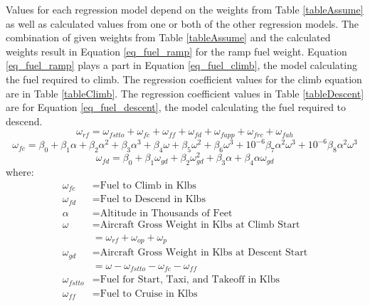 Values for each regression model depend on the weights from Table \ref{tableAssume} as well as calculated values from one or both of the other regression models.  The combination of given weights from Table \ref{tableAssume} and the calculated weights result in Equation \ref{eq_fuel_ramp} for the ramp fuel weight. Equation  \ref{eq_fuel_ramp} plays a part in Equation \ref{eq_fuel_climb}, the model calculating the fuel required to climb.  The regression coefficient values for the climb equation are in Table \ref{tableClimb}. The regression coefficient values in Table \ref{tableDescent} are for Equation \ref{eq_fuel_descent}, the model calculating the fuel required to descend.  \newline
\begin{equation}
\label{eq_fuel_ramp}
\omega_{rf}=\omega_{fstto}+\omega_{fc}+\omega_{ff}+\omega_{fd}+ \omega_{fapp}+\omega_{frc}+\omega_{fah}
\end{equation}
\begin{equation}
\label{eq_fuel_climb}
\omega_{fc}=\beta_0+\beta_1\alpha+\beta_2\alpha^2+\beta_3\alpha^3+\beta_4\omega+\beta_5\omega^2+\beta_6\omega^3+10^{-6}\beta_7\alpha^2\omega^3+10^{-6}\beta_8\alpha^2\omega^3
\end{equation}
\begin{equation}
\label{eq_fuel_descent}
\omega_{fd}=\beta_0+\beta_1\omega_{gd}+\beta_2\omega_{gd}^2+\beta_3\alpha+\beta_4\alpha\omega_{gd}
\end{equation}
\setlength{\jot}{-1ex}
\renewcommand*\arraystretch{.8}
where:
\begin{align*}
\omega_{fc} &= \text{Fuel to Climb in Klbs}\\
\omega_{fd} &= \text{Fuel to Descend in Klbs}\\
\alpha &= \text{Altitude in Thousands of Feet}\\
\omega &=\text{Aircraft Gross Weight in Klbs at Climb Start}\\
&=\omega_{rf}+\omega_{op}+\omega_p\\
\omega_{gd} &=\text{Aircraft Gross Weight in Klbs at Descent Start}\\
&= \omega-\omega_{fstto}-\omega_{fc}-\omega_{ff}\\
\omega_{fstto} &= \text{Fuel for Start, Taxi, and Takeoff in Klbs}\\
\omega_{ff} &=\text{Fuel to Cruise in Klbs}
\end{align*}
